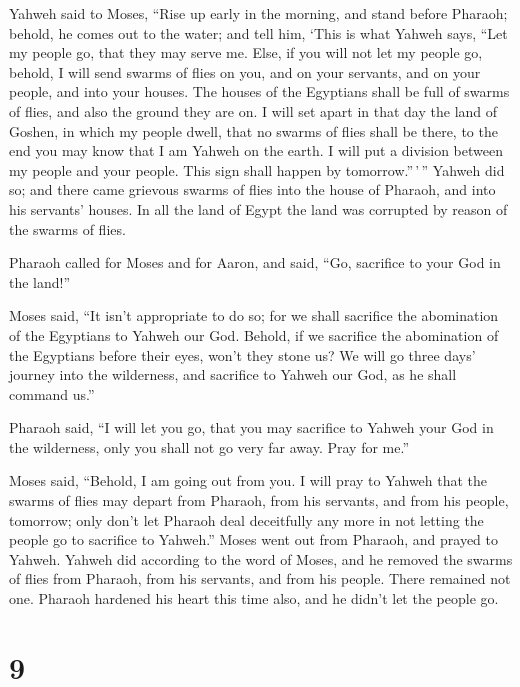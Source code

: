  Yahweh said to Moses, ``Rise up early in the morning, and
stand before Pharaoh; behold, he comes out to the water; and tell him,
`This is what Yahweh says, ``Let my people go, that they may serve me.
 Else, if you will not let my people go, behold, I will
send swarms of flies on you, and on your servants, and on your people,
and into your houses. The houses of the Egyptians shall be full of
swarms of flies, and also the ground they are on.  I will
set apart in that day the land of Goshen, in which my people dwell, that
no swarms of flies shall be there, to the end you may know that I am
Yahweh on the earth.  I will put a division between my
people and your people. This sign shall happen by tomorrow.''\,'\,''
 Yahweh did so; and there came grievous swarms of flies
into the house of Pharaoh, and into his servants' houses. In all the
land of Egypt the land was corrupted by reason of the swarms of flies.

 Pharaoh called for Moses and for Aaron, and said, ``Go,
sacrifice to your God in the land!''

 Moses said, ``It isn't appropriate to do so; for we shall
sacrifice the abomination of the Egyptians to Yahweh our God. Behold, if
we sacrifice the abomination of the Egyptians before their eyes, won't
they stone us?  We will go three days' journey into the
wilderness, and sacrifice to Yahweh our God, as he shall command us.''

 Pharaoh said, ``I will let you go, that you may sacrifice
to Yahweh your God in the wilderness, only you shall not go very far
away. Pray for me.''

 Moses said, ``Behold, I am going out from you. I will pray
to Yahweh that the swarms of flies may depart from Pharaoh, from his
servants, and from his people, tomorrow; only don't let Pharaoh deal
deceitfully any more in not letting the people go to sacrifice to
Yahweh.''  Moses went out from Pharaoh, and prayed to
Yahweh.  Yahweh did according to the word of Moses, and he
removed the swarms of flies from Pharaoh, from his servants, and from
his people. There remained not one.  Pharaoh hardened his
heart this time also, and he didn't let the people go.

\hypertarget{section-8}{%
\section{9}\label{section-8}}

